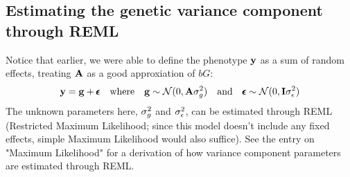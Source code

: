 \documentclass[12pt]{article}
\begin{document}
\subsection{Estimating the genetic variance component through REML}
Notice that earlier, we were able to define the phenotype $\mathbf{y}$ as a sum of random effects, treating $\mathbf{A}$ as a good approxiation of $bG$:
\begin{equation*}
\mathbf{y} = \mathbf{g} + \pmb{\epsilon}
\quad\mathrm{where}\quad
\mathbf{g} \sim \mathcal{N}(0, \mathbf{A} \sigma_g^2)
\quad\mathrm{and}\quad
\pmb{\epsilon} \sim \mathcal{N}(0, \mathbf{I} \sigma_{\epsilon}^2)
\end{equation*}
The unknown parameters here, $\sigma_g^2$ and $\sigma_{\epsilon}^2$, can be estimated through REML (Restricted Maximum Likelihood; since this model doesn't include any fixed effects, simple Maximum Likelihood would also suffice). See the entry on "Maximum Likelihood" for a derivation of how variance component parameters are estimated through REML.
\end{document}
